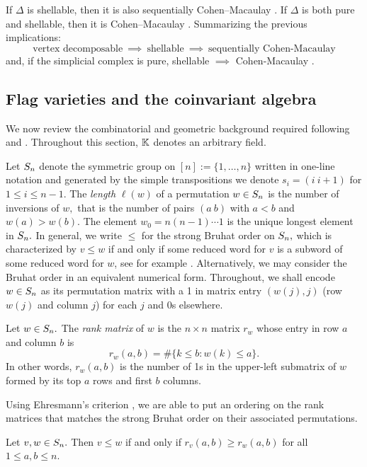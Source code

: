 If $\Delta$ is shellable, then it is also sequentially Cohen--Macaulay
\cite[Thm.~11.3]{BjornerWachsII}. If $\Delta$ is both pure and shellable, then it is
Cohen--Macaulay \cite[Ch.~III]{Stanley1996}.
Summarizing the previous implications:
\[
\text{vertex decomposable}~\implies~\text{shellable}~\implies~\text{sequentially Cohen-Macaulay}
\]
and, if the simplicial complex is pure, shellable $\implies$ Cohen-Macaulay \cite{bjorner1996shellable,Stanley1996}.

\subsection{Flag varieties and the coinvariant algebra}
\label{subsec: Flag varieties and the coinvariant algebra}
We now review the combinatorial and geometric background required following \cite{BjornerBrenti} and \cite{FultonYoungTableaux}. Throughout this section, $\mathbb{K}$ denotes an arbitrary field.

Let $S_n$ denote the symmetric group on $[n]:=\{1,\ldots,n\}$ written in one-line notation and generated by the simple transpositions we denote $s_i = (i~i+1)$ for $1\leq i\leq n-1.$
The \emph{length} $\ell(w)$ of a permutation $w\in S_n$ is the number of inversions of $w,$ that is the number of pairs $(a~b)$ with $a < b$ and $w(a)>w(b).$ The element $w_0 = n(n-1)\cdots 1$ is the unique longest element in $S_n.$ In general, we write $\leq$ for the strong Bruhat order on $S_n,$ which is characterized by $v\leq w$ if and only if some reduced word for $v$ is a subword of some reduced word for $w$, see for example \cite{BjornerBrenti}. Alternatively, we may consider the Bruhat order in an equivalent numerical form.
Throughout, we shall encode $w\in S_n$ as its permutation matrix with a 1 in matrix entry $(w(j),j)$ (row $w(j)$ and column $j$) for each $j$ and 0s elsewhere.
\begin{definition}
    Let $w\in S_n.$ The \emph{rank matrix} of $w$ is the $n\times n $ matrix $r_w$ whose entry in row $a$ and column $b$ is
    \[
    r_w(a,b) = \#\{k\leq b : w(k)\leq a\}.
    \]
    In other words, $r_w(a,b)$ is the number of 1s in the upper-left submatrix of $w$ formed by its top $a$ rows and first $b$ columns.
\end{definition}
Using Ehresmann's criterion \cite{ehresmann}, we are able to put an ordering on the rank matrices that matches the strong Bruhat order on their associated permutations.
\begin{proposition}\cite{BjornerBrenti}
\label{prop: Ehresmann's criterion}
    Let $v,w\in S_n.$ Then $v\leq w$ if and only if $r_v(a,b)\geq r_w(a,b)$ for all $1\leq a,b\leq n.$
\end{proposition}



